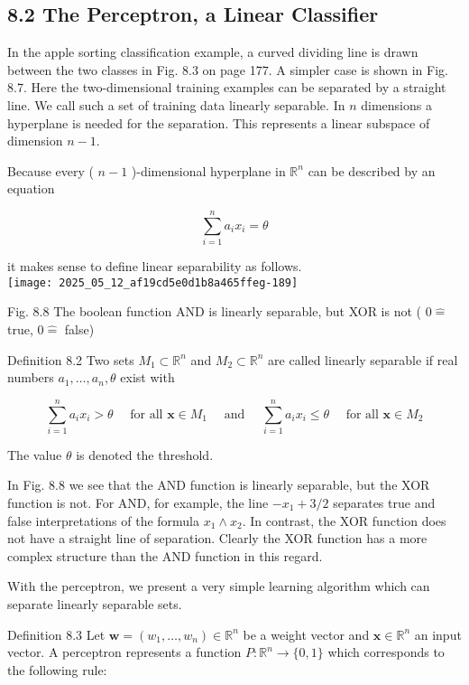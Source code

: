 \documentclass[10pt]{article}
\begin{document}
\subsection*{8.2 The Perceptron, a Linear Classifier}
In the apple sorting classification example, a curved dividing line is drawn between the two classes in Fig. 8.3 on page 177. A simpler case is shown in Fig. 8.7. Here the two-dimensional training examples can be separated by a straight line. We call such a set of training data linearly separable. In $n$ dimensions a hyperplane is needed for the separation. This represents a linear subspace of dimension $n-1$.

Because every ( $n-1$ )-dimensional hyperplane in $\mathbb{R}^{n}$ can be described by an equation

$$
\sum_{i=1}^{n} a_{i} x_{i}=\theta
$$

it makes sense to define linear separability as follows.\\
\texttt{[image: 2025\_05\_12\_af19cd5e0d1b8a465ffeg-189]}

Fig. 8.8 The boolean function AND is linearly separable, but XOR is not ( $0 \hat{=}$ true, $0 \hat{=}$ false)

Definition 8.2 Two sets $M_{1} \subset \mathbb{R}^{n}$ and $M_{2} \subset \mathbb{R}^{n}$ are called linearly separable if real numbers $a_{1}, \ldots, a_{n}, \theta$ exist with

$$
\sum_{i=1}^{n} a_{i} x_{i}>\theta \quad \text { for all } \boldsymbol{x} \in M_{1} \quad \text { and } \quad \sum_{i=1}^{n} a_{i} x_{i} \leq \theta \quad \text { for all } \boldsymbol{x} \in M_{2}
$$

The value $\theta$ is denoted the threshold.

In Fig. 8.8 we see that the AND function is linearly separable, but the XOR function is not. For AND, for example, the line $-x_{1}+3 / 2$ separates true and false interpretations of the formula $x_{1} \wedge x_{2}$. In contrast, the XOR function does not have a straight line of separation. Clearly the XOR function has a more complex structure than the AND function in this regard.

With the perceptron, we present a very simple learning algorithm which can separate linearly separable sets.

Definition 8.3 Let $\boldsymbol{w}=\left(w_{1}, \ldots, w_{n}\right) \in \mathbb{R}^{n}$ be a weight vector and $\boldsymbol{x} \in \mathbb{R}^{n}$ an input vector. A perceptron represents a function $P: \mathbb{R}^{n} \rightarrow\{0,1\}$ which corresponds to the following rule:
\end{document}
